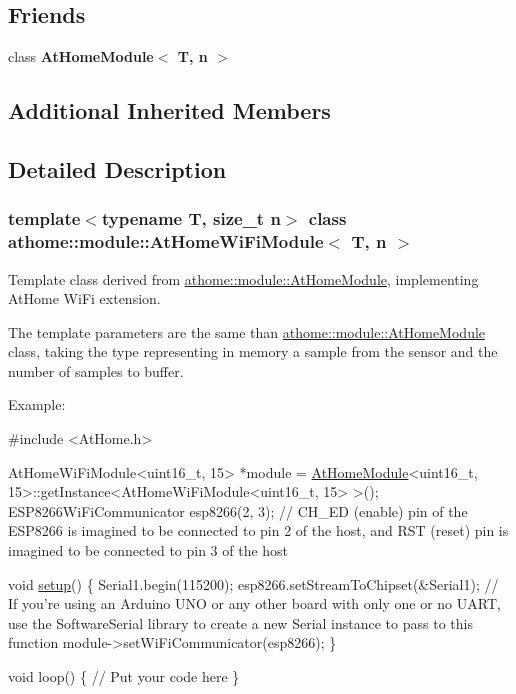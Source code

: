 \subsection*{Friends}
\begin{DoxyCompactItemize}
\item 
\mbox{\label{classathome_1_1module_1_1_at_home_wi_fi_module_a5db9640f2e295c39a19645b0d682d7d5}} 
class {\bfseries At\+Home\+Module$<$ T, n $>$}
\end{DoxyCompactItemize}
\subsection*{Additional Inherited Members}


\subsection{Detailed Description}
\subsubsection*{template$<$typename T, size\+\_\+t n$>$\newline
class athome\+::module\+::\+At\+Home\+Wi\+Fi\+Module$<$ T, n $>$}

Template class derived from \mbox{\hyperlink{classathome_1_1module_1_1_at_home_module}{athome\+::module\+::\+At\+Home\+Module}}, implementing At\+Home Wi\+Fi extension.

The template parameters are the same than \mbox{\hyperlink{classathome_1_1module_1_1_at_home_module}{athome\+::module\+::\+At\+Home\+Module}} class, taking the type representing in memory a sample from the sensor and the number of samples to buffer.

Example\+:


\begin{DoxyCode}
\textcolor{preprocessor}{#include <AtHome.h>}

AtHomeWiFiModule<uint16\_t, 15> *module = \mbox{\hyperlink{classathome_1_1module_1_1_at_home_module_ad78045943a579874ec16e14cf976eada}{AtHomeModule}}<uint16\_t,
15>::getInstance<AtHomeWiFiModule<uint16\_t, 15> >(); ESP8266WiFiCommunicator
esp8266(2, 3); \textcolor{comment}{// CH\_ED (enable) pin of the ESP8266 is imagined to be}
connected to pin 2 of the host, and RST (reset) pin is imagined to be
connected to pin 3 of the host

\textcolor{keywordtype}{void} \mbox{\hyperlink{classathome_1_1module_1_1_at_home_module_a5354c736954a788c51e7cf25f6ccf89d}{setup}}() \{
  Serial1.begin(115200);
  esp8266.setStreamToChipset(&Serial1); \textcolor{comment}{// If you're using an Arduino UNO or}
any other board with only one or no UART, use the SoftwareSerial library to
create a \textcolor{keyword}{new} Serial instance to pass to \textcolor{keyword}{this} \textcolor{keyword}{function}
  module->setWiFiCommunicator(esp8266);
\}

\textcolor{keywordtype}{void} loop() \{
  \textcolor{comment}{// Put your code here}
\}
\end{DoxyCode}
 

